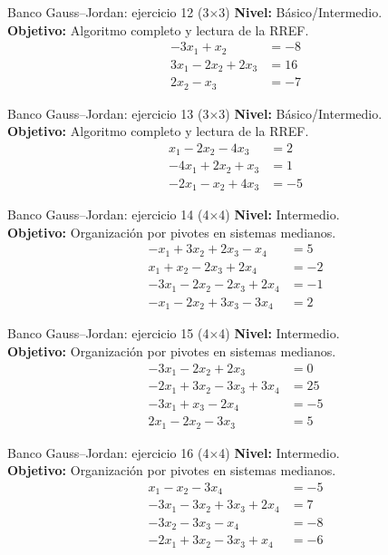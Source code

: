 \documentclass[aspectratio=169,9pt]{beamer}
\theoremstyle{remark}
\begin{document}
\begin{frame}[t]{Banco Gauss--Jordan: ejercicio 12 (3$\times$3)}
\textbf{Nivel:} Básico/Intermedio.\\
\textbf{Objetivo:} Algoritmo completo y lectura de la RREF.
\[
\begin{aligned}
- 3 x_{1} + x_{2} &= -8\\
3 x_{1} - 2 x_{2} + 2 x_{3} &= 16\\
2 x_{2} - x_{3} &= -7
\end{aligned}
\]
\end{frame}
\begin{frame}[t]{Banco Gauss--Jordan: ejercicio 13 (3$\times$3)}
\textbf{Nivel:} Básico/Intermedio.\\
\textbf{Objetivo:} Algoritmo completo y lectura de la RREF.
\[
\begin{aligned}
x_{1} - 2 x_{2} - 4 x_{3} &= 2\\
- 4 x_{1} + 2 x_{2} + x_{3} &= 1\\
- 2 x_{1} - x_{2} + 4 x_{3} &= -5
\end{aligned}
\]
\end{frame}
\begin{frame}[t]{Banco Gauss--Jordan: ejercicio 14 (4$\times$4)}
\textbf{Nivel:} Intermedio.\\
\textbf{Objetivo:} Organización por pivotes en sistemas medianos.
\[
\begin{aligned}
- x_{1} + 3 x_{2} + 2 x_{3} - x_{4} &= 5\\
x_{1} + x_{2} - 2 x_{3} + 2 x_{4} &= -2\\
- 3 x_{1} - 2 x_{2} - 2 x_{3} + 2 x_{4} &= -1\\
- x_{1} - 2 x_{2} + 3 x_{3} - 3 x_{4} &= 2
\end{aligned}
\]
\end{frame}
\begin{frame}[t]{Banco Gauss--Jordan: ejercicio 15 (4$\times$4)}
\textbf{Nivel:} Intermedio.\\
\textbf{Objetivo:} Organización por pivotes en sistemas medianos.
\[
\begin{aligned}
- 3 x_{1} - 2 x_{2} + 2 x_{3} &= 0\\
- 2 x_{1} + 3 x_{2} - 3 x_{3} + 3 x_{4} &= 25\\
- 3 x_{1} + x_{3} - 2 x_{4} &= -5\\
2 x_{1} - 2 x_{2} - 3 x_{3} &= 5
\end{aligned}
\]
\end{frame}
\begin{frame}[t]{Banco Gauss--Jordan: ejercicio 16 (4$\times$4)}
\textbf{Nivel:} Intermedio.\\
\textbf{Objetivo:} Organización por pivotes en sistemas medianos.
\[
\begin{aligned}
x_{1} - x_{2} - 3 x_{4} &= -5\\
- 3 x_{1} - 3 x_{2} + 3 x_{3} + 2 x_{4} &= 7\\
- 3 x_{2} - 3 x_{3} - x_{4} &= -8\\
- 2 x_{1} + 3 x_{2} - 3 x_{3} + x_{4} &= -6
\end{aligned}
\]
\end{frame}
\end{document}
